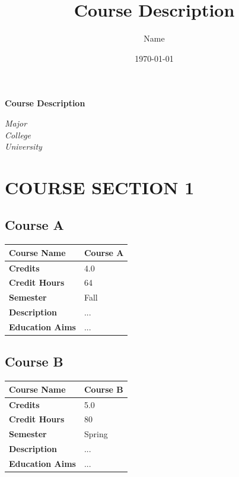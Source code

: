 \documentclass{article}
\title{Course Description}
\author{Name}
\date{\today}
\newcommand{\majorname}{Major}
\newcommand{\collegename}{College}
\newcommand{\universityname}{University}
\begin{document}
\begin{titlepage}
 \centering
 \vspace*{4cm}
 \Huge \textbf{Course Description} \\
 \vspace{10cm}
 \begin{flushright}
  \emph{\Large\majorname}\\
  \vspace{0.1cm}
  \emph{\Large\collegename}\\
  \vspace{0.1cm}
  \emph{\Large\universityname}
 \end{flushright}
\end{titlepage}

\clearpage
\setcounter{page}{1}
\tableofcontents %
\clearpage

\pagestyle{fancy} %

\section{COURSE SECTION 1}

\subsection{Course A}
\renewcommand{\arraystretch}{1.5} %
\begin{longtable}{|p{3cm}|p{10cm}|}
\hline
\textbf{Course Name} & Course A\\
\hline
\textbf{Credits} & 4.0 \\
\hline
\textbf{Credit Hours} & 64\\
\hline
\textbf{Semester} & Fall \\
\hline
\textbf{Description} & ... \\
\hline
\textbf{Education Aims} & ... \\
\hline
\end{longtable}


\subsection{Course B}
\renewcommand{\arraystretch}{1.5} %
\begin{longtable}{|p{3cm}|p{10cm}|}
\hline
\textbf{Course Name} & Course B\\
\hline
\textbf{Credits} & 5.0 \\
\hline
\textbf{Credit Hours} & 80\\
\hline
\textbf{Semester} & Spring \\
\hline
\textbf{Description} & ... \\
\hline
\textbf{Education Aims} & ... \\
\hline
\end{longtable}
\end{document}
